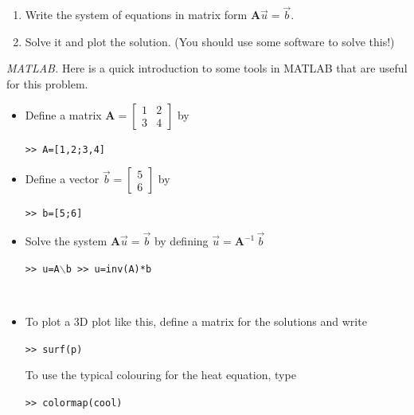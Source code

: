 \begin{enumerate}[resume, label=\emph{\arabic*.}] 
\item Write the system of equations in matrix form $\textbf{A} \vec{u} = \vec{b}$.

\item Solve it and plot the solution. (You should use some software to solve this!)

\end{enumerate}

\vfill

\emph{MATLAB. } Here is a quick introduction to some tools in MATLAB that are useful for this problem.

\begin{itemize}
\item Define a matrix $\textbf{A} = \begin{bmatrix}  1 & 2 \\ 3 & 4 \end{bmatrix}$ by
\begin{center}
\tt >> A=[1,2;3,4]
\end{center}

\item Define a vector $\vec{b} = \begin{bmatrix}  5 \\ 6 \end{bmatrix}$ by
\begin{center}
\tt >> b=[5;6]
\end{center}

\item Solve the system $\textbf{A}\vec{u} = \vec{b}$ by defining $\vec{u} = \textbf{A}^{-1} \, \vec{b}$
\begin{center}
\tt >> u=A$\backslash$b
 \qquad 
>> u=inv(A)*b
\end{center}

\hfil\\

\item To plot a 3D plot like this, define a matrix for the solutions and write
\begin{center}
\tt >> surf(p)
\end{center}

To use the typical colouring for the heat equation, type 
\begin{center}
\tt >> colormap(cool)
\end{center}

\end{itemize}


